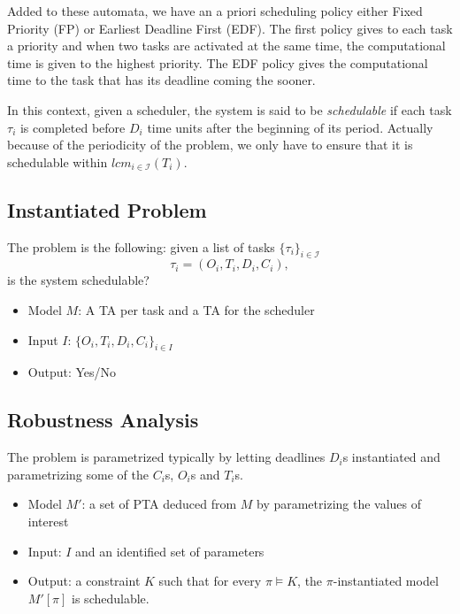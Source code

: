 \documentclass{article}
\begin{document}
Added to these automata, we have an a priori scheduling policy either Fixed Priority (FP) or Earliest Deadline First (EDF). The first policy gives to each task a priority and when
two tasks are activated at the same time, the computational time is given to the highest priority. The EDF policy gives the computational time to the task that has its deadline coming
the sooner.

In this context, given a scheduler, the system is said to be \emph{schedulable} if each task $\tau_i$ is completed before $D_i$ time units after the beginning of its period. 
Actually because of the periodicity of the problem, we only have to ensure that it is schedulable within $lcm_{i\in \mathcal{I}}(T_i)$.

\subsection{Instantiated Problem}
The problem is the following: given a list of tasks $\{\tau_i\}_{i \in \mathcal{I}}$ $$\tau_i = (O_i,T_i,D_i,C_i),$$ is the system schedulable?\\
\begin{itemize}
 \item Model $M$: A TA per task and a TA for the scheduler
 \item Input $I$: $\{O_i,T_i,D_i,C_i\}_{i \in I}$
 \item Output: Yes/No
\end{itemize}


\subsection{Robustness Analysis}
The problem is parametrized typically by letting deadlines $D_i$s instantiated and parametrizing some of the $C_i$s, $O_i$s and $T_i$s.
\begin{itemize}
 \item Model $M'$: a set of PTA deduced from $M$ by parametrizing the values of interest
 \item Input: $I$ and an identified set of parameters
 \item Output: a constraint $K$ such that for every $\pi \models K$, the $\pi$-instantiated model $M'[\pi]$ is schedulable.
\end{itemize}


% 
% 
% 
\end{document}
